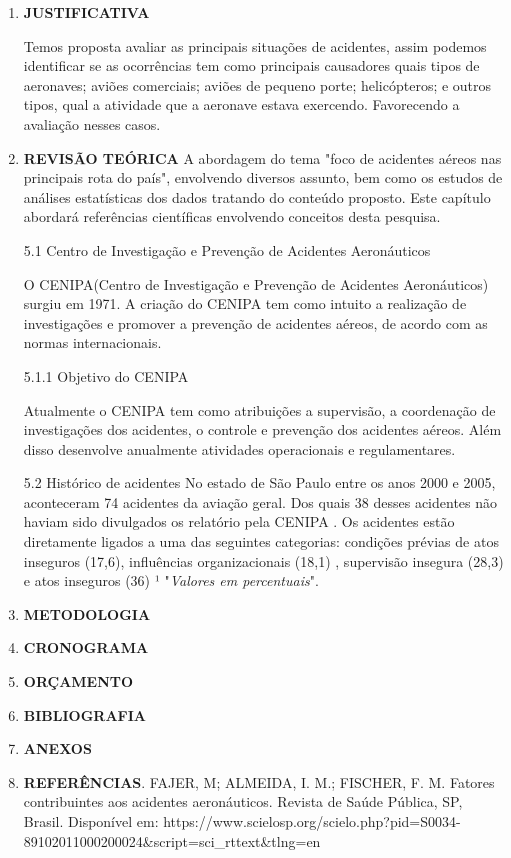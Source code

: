\documentclass[14pt, a4paper]{article}
\begin{document}
\begin{enumerate}
	
	
	
	\item \textbf{JUSTIFICATIVA}\newline
		
	Temos proposta avaliar as principais situações de acidentes, assim podemos identificar se as ocorrências tem como principais causadores quais tipos de aeronaves; aviões comerciais; aviões de pequeno porte; helicópteros; e outros tipos, qual a atividade que a aeronave estava exercendo. Favorecendo a avaliação nesses casos.
	
	
	\item \textbf{REVISÃO TEÓRICA}\newline
	A abordagem do tema "foco de acidentes aéreos nas principais rota do país", envolvendo diversos assunto, bem como os estudos de análises estatísticas dos dados tratando do conteúdo proposto. Este capítulo abordará referências científicas envolvendo conceitos desta pesquisa.
	
	
	5.1 Centro de Investigação e Prevenção de Acidentes Aeronáuticos
	
	O CENIPA(Centro de Investigação e Prevenção de Acidentes Aeronáuticos) surgiu em 1971. A criação do CENIPA tem como intuito a realização de  investigações e promover a prevenção de acidentes aéreos, de acordo com as normas internacionais.
	
	5.1.1 Objetivo do CENIPA
	
	Atualmente o CENIPA tem como atribuições a supervisão, a coordenação de investigações dos acidentes, o controle e prevenção dos acidentes aéreos. Além disso desenvolve anualmente atividades operacionais e regulamentares.
	
	5.2 Histórico de acidentes
	No estado de São Paulo entre os anos 2000 e 2005, aconteceram 74 acidentes da aviação geral. Dos quais 38 desses acidentes não haviam sido divulgados os relatório pela CENIPA . Os acidentes estão diretamente ligados a uma das seguintes categorias: condições prévias de atos inseguros (17,6),  influências organizacionais (18,1) , supervisão insegura (28,3) e atos inseguros (36) ¹ "\textit{Valores em percentuais}".
	    
	
	\item \textbf{METODOLOGIA}\newline
	\item \textbf{CRONOGRAMA}\newline
	\item \textbf{ORÇAMENTO}\newline
	\item \textbf{BIBLIOGRAFIA}\newline
	\item \textbf{ANEXOS}\newline
	\item \textbf{REFERÊNCIAS}. FAJER, M; ALMEIDA, I. M.; FISCHER, F. M. Fatores contribuintes aos acidentes aeronáuticos. Revista de Saúde Pública, SP, Brasil. Disponível em: https://www.scielosp.org/scielo.php?pid=S0034-89102011000200024&script=sci_rttext&tlng=en
	\end{enumerate}

	
\end{document}
